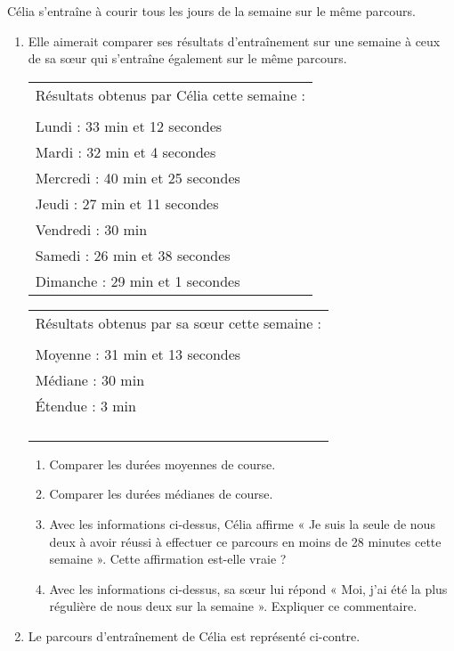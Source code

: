 Célia s'entraîne à courir tous les jours de la semaine sur le même parcours.
\begin{enumerate}
    \item Elle aimerait comparer ses résultats d'entraînement sur une semaine à ceux de sa s\oe ur qui s’entraîne également sur le même parcours.
    
    \medskip
	\noindent\begin{tabularx}{0.4\linewidth}{|X|}
        \hline 		
        Résultats obtenus par Célia cette semaine :\\
        \\
        Lundi : 33 min et 12 secondes\\
        Mardi : 32 min et 4 secondes\\
        Mercredi : 40 min et 25 secondes\\
        Jeudi : 27 min et 11 secondes\\
        Vendredi : 30 min\\
        Samedi : 26 min et 38 secondes\\
        Dimanche : 29 min et 1 secondes\\
        \hline 
    \end{tabularx}
    \hspace{1cm}
    \noindent\begin{tabularx}{0.45\linewidth}{|X|}
        \hline 		
        Résultats obtenus par sa s\oe ur cette semaine :\\
        \\
        Moyenne : 31 min et 13 secondes\\
        Médiane : 30 min\\
        Étendue : 3 min\\
        \\
        \\
        \\
        \\
        \hline 
    \end{tabularx}
    \medskip
    \begin{enumerate}
        \item Comparer les durées moyennes de course.
        \item Comparer les durées médianes de course.
        \item Avec les informations ci-dessus, Célia affirme « Je suis la seule de nous deux à avoir
        réussi à effectuer ce parcours en moins de 28 minutes cette semaine ». Cette affirmation est-elle vraie ?
        \item Avec les informations ci-dessus, sa s\oe ur lui répond « Moi, j’ai été la plus régulière de
        nous deux sur la semaine ». Expliquer ce commentaire.
    \end{enumerate}
    \item Le parcours d’entraînement de Célia est représenté ci-contre.
    

\end{enumerate}
